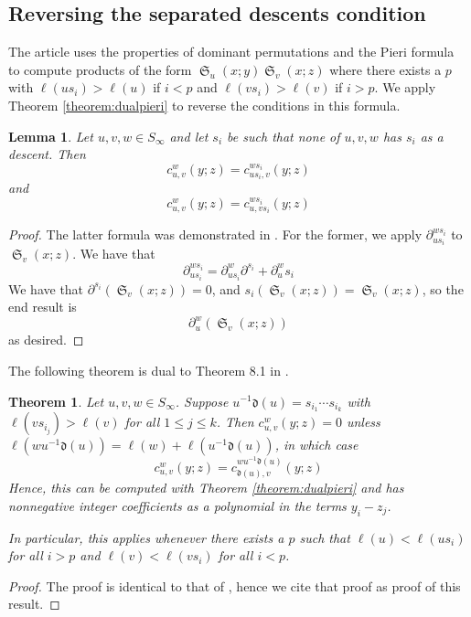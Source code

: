 \documentclass[reqno]{amsart}
\newtheorem{lemma}{Lemma}[subsection]
\newtheorem{theorem}{Theorem}[section]
\theoremstyle{definition}
\theoremstyle{remark}
\numberwithin{equation}{subsection}
\DeclareMathOperator{\sch}{\mathfrak{S}}
\newcommand{\dom}{\mathfrak{d}}
\begin{document}
\subsection{Reversing the separated descents condition}
%
The article \cite{samuelmolev} uses the properties of dominant permutations and the Pieri formula to compute products of the form $\sch_u(x;y)\sch_v(x;z)$ where there exists a $p$ with $\ell(us_i)>\ell(u)$ if $i<p$ and $\ell(vs_i)>\ell(v)$ if $i>p$. We apply Theorem \ref{theorem:dualpieri} to reverse the conditions in this formula.
%
\begin{lemma} \label{lemma:shiftup}
Let $u,v,w\in S_\infty$ and let $s_i$ be such that none of $u,v,w$ has $s_i$ as a descent. Then
$$c_{u,v}^w(y;z)=c_{us_i,v}^{ws_i}(y;z)$$
and
$$c_{u,v}^w(y;z)=c_{u,vs_i}^{ws_i}(y;z)$$
\end{lemma}
\begin{proof}
The latter formula was demonstrated in \cite{samuelmolev}. For the former, we apply $\partial_{us_i}^{ws_i}$ to $\sch_v(x;z)$. We have that
$$\partial_{us_i}^{ws_i}=\partial_{us_i}^{w}\partial^{s_i}+\partial_{u}^ws_i$$
We have that $\partial^{s_i}(\sch_v(x;z))=0$, and $s_i(\sch_v(x;z))=\sch_v(x;z)$, so the end result is
$$\partial_u^w(\sch_v(x;z))$$
as desired.
\end{proof}
%
The following theorem is dual to Theorem 8.1 in \cite{samuelmolev}.
\begin{theorem} \label{theorem:appl}
Let $u,v,w\in S_\infty$. Suppose $u^{-1}\dom(u)=s_{i_1}\cdots s_{i_k}$ with $\ell(vs_{i_j})>\ell(v)$ for all $1\leq j\leq k$. Then $c_{u,v}^w(y;z)=0$ unless $\ell(wu^{-1}\dom(u))=\ell(w)+\ell(u^{-1}\dom(u))$, in which case
$$c_{u,v}^w(y;z)=c_{\dom(u),v}^{wu^{-1}\dom(u)}(y;z)$$
Hence, this can be computed with Theorem \ref{theorem:dualpieri} and has nonnegative integer coefficients as a polynomial in the terms $y_i-z_j$. 

In particular, this applies whenever there exists a $p$ such that $\ell(u)<\ell(us_i)$ for all $i>p$ and $\ell(v)<\ell(vs_i)$ for all $i<p$.
\end{theorem}
\begin{proof}
The proof is identical to that of \cite[Proposition~4.3]{samuelmolev}, hence we cite that proof as proof of this result.
\end{proof}
\end{document}
